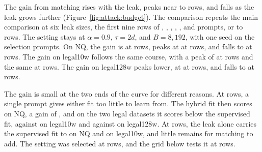 The gain from matching rises with the leak, peaks near  to  rows, and falls as the leak grows further (Figure~\ref{fig:attack:budget}).
The comparison repeats the main comparison at six leak sizes, the first nine rows of , , , , , and  prompts, or  to  rows. %
The setting stays at $\alpha = 0.9$, $\tau = 2d$, and $B = 8{,}192$, with one seed on the selection prompts.
On NQ, the gain is  at  rows, peaks at  at  rows, and falls to  at  rows. %
The gain on legal10w follows the same course, with a peak of  at  rows and the same  at  rows. %
The gain on legal128w peaks lower, at  at  rows, and falls to  at  rows. %

The gain is small at the two ends of the curve for different reasons.
At  rows, a single prompt gives either fit too little to learn from.
The hybrid fit then scores  on NQ, a gain of , and on the two legal datasets it scores below the supervised fit,  against  on legal10w and  against  on legal128w. %
At  rows, the leak alone carries the supervised fit to  on NQ and  on legal10w, and little remains for matching to add.
The setting was selected at  rows, and the grid below tests it at  rows.

